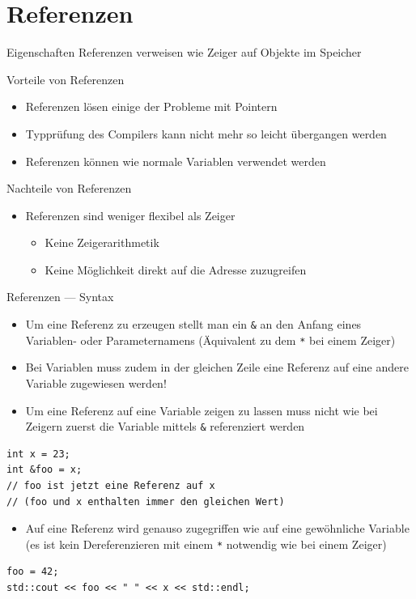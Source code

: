 \documentclass[presentation]{beamer}
\begin{document}
\section{Referenzen}
\label{sec:org349ad25}
\begin{frame}[label={sec:orgd0c3af1}]{Eigenschaften}
Referenzen verweisen wie Zeiger auf Objekte im Speicher
\begin{block}{Vorteile von Referenzen}
\begin{itemize}
\item Referenzen lösen einige der Probleme mit Pointern
\item Typprüfung des Compilers kann nicht mehr so leicht übergangen werden
\item Referenzen können wie normale Variablen verwendet werden
\end{itemize}
\end{block}
\begin{block}{Nachteile von Referenzen}
\begin{itemize}
\item Referenzen sind weniger flexibel als Zeiger
\begin{itemize}
\item Keine Zeigerarithmetik
\item Keine Möglichkeit direkt auf die Adresse zuzugreifen
\end{itemize}
\end{itemize}
\end{block}
\end{frame}
\begin{frame}[label={sec:org9ab754e},fragile]{Referenzen --- Syntax}
 \begin{itemize}
\item Um eine Referenz zu erzeugen stellt man ein {\color{solarizedYellow}\verb!&!} an den Anfang eines
Variablen- oder Parameternamens (Äquivalent zu dem {\color{solarizedYellow}\verb!*!} bei einem
Zeiger)
\item \alert{Bei Variablen muss zudem in der gleichen Zeile eine Referenz auf
eine andere Variable zugewiesen werden!}
\item Um eine Referenz auf eine Variable zeigen zu lassen muss nicht wie
bei Zeigern zuerst die Variable mittels {\color{solarizedYellow}\verb!&!} referenziert werden
\end{itemize}
\begin{verbatim}
int x = 23;
int &foo = x;
// foo ist jetzt eine Referenz auf x 
// (foo und x enthalten immer den gleichen Wert)
\end{verbatim}
\begin{itemize}
\item Auf eine Referenz wird genauso zugegriffen wie auf eine gewöhnliche
Variable (es ist kein Dereferenzieren mit einem {\color{solarizedYellow}\verb!*!} notwendig wie
bei einem Zeiger)
\end{itemize}
\begin{verbatim}
foo = 42;
std::cout << foo << " " << x << std::endl;
\end{verbatim}
\end{frame}
\end{document}
